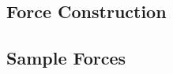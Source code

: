 

\subsection{Force Construction}
\label{subsec:force_construction}



\newpage

\subsection{Sample Forces}
\label{subsec:sample_forces}



\newpage
